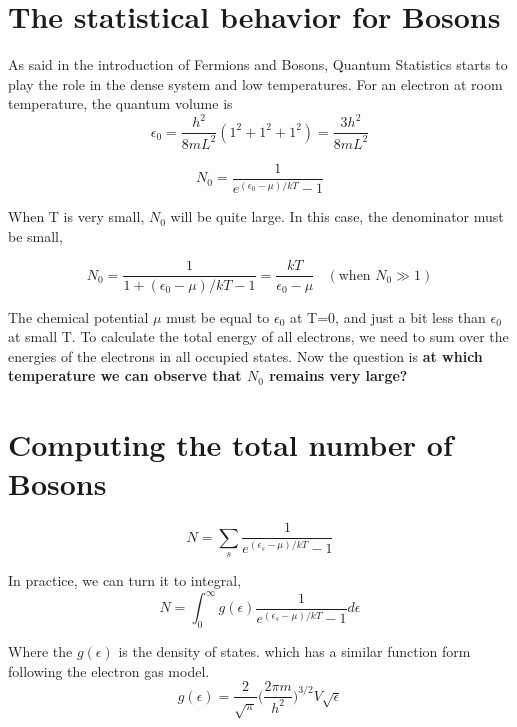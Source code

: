 
\section{The statistical behavior for Bosons}
As said in the introduction of Fermions and Bosons, Quantum Statistics starts to play the role in the dense system and low temperatures.
For an electron at room temperature, the quantum volume is
\begin{equation}
\epsilon_0 = \frac{h^2}{8mL^2}(1^2+1^2+1^2) = \frac{3h^2}{8mL^2}
\end{equation}

\begin{equation}
N_0 = \frac{1}{e^{(\epsilon_0-\mu)/kT}-1}
\end{equation}

When T is very small, $N_0$ will be quite large. In this case, the denominator must be small,

\begin{equation}
N_0 = \frac{1}{1+(\epsilon_0-\mu)/kT-1} = \frac{kT}{\epsilon_0-\mu}  ~~~~(\textrm{when~} N_0 \gg 1)
\end{equation}

The chemical potential $\mu$ must be equal to $\epsilon_0$ at T=0, and just a bit less than $\epsilon_0$ at small T. To calculate the total energy of all electrons, we need to sum over the energies of the electrons in all occupied states. Now the question is \textbf{at which temperature we can observe that $N_0$ remains very large?}


\section{Computing the total number of Bosons}
\begin{equation}
N = \sum_s \frac{1}{e^{(\epsilon_s-\mu)/kT}-1}
\end{equation}

In practice, we can turn it to integral,
\begin{equation}
\label{eq0}
N = \int_0^\infty g(\epsilon)\frac{1}{e^{(\epsilon_s-\mu)/kT}-1}d\epsilon
\end{equation}

Where the $g(\epsilon)$ is the density of states. which has a similar function form following the electron gas model. 
\begin{equation}
g(\epsilon) = \frac{2}{\sqrt{\pi}}\bigg(\frac{2\pi m}{h^2}\bigg)^{3/2}V\sqrt{\epsilon}
\end{equation}

